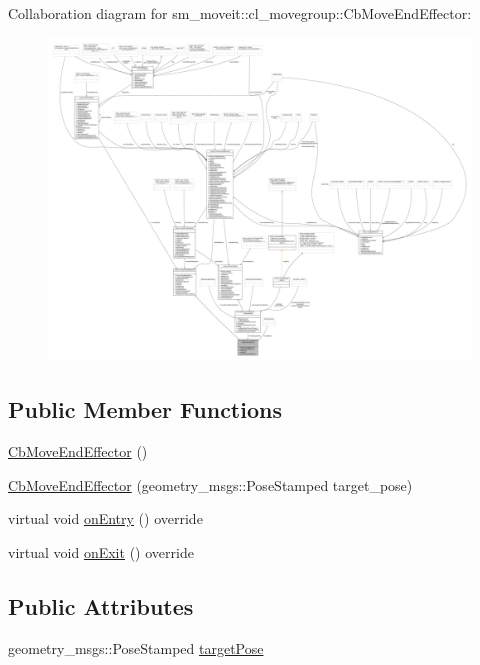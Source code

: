 Collaboration diagram for sm\+\_\+moveit\+:\+:cl\+\_\+movegroup\+:\+:Cb\+Move\+End\+Effector\+:
\nopagebreak
\begin{figure}[H]
\begin{center}
\leavevmode
\includegraphics[width=350pt]{classsm__moveit_1_1cl__movegroup_1_1CbMoveEndEffector__coll__graph}
\end{center}
\end{figure}
\subsection*{Public Member Functions}
\begin{DoxyCompactItemize}
\item 
\hyperlink{classsm__moveit_1_1cl__movegroup_1_1CbMoveEndEffector_a38a92c1ccfbd85eea5de376a50faf414}{Cb\+Move\+End\+Effector} ()
\item 
\hyperlink{classsm__moveit_1_1cl__movegroup_1_1CbMoveEndEffector_a9c41c91e8d1a1ff202e32a68bc8e8f78}{Cb\+Move\+End\+Effector} (geometry\+\_\+msgs\+::\+Pose\+Stamped target\+\_\+pose)
\item 
virtual void \hyperlink{classsm__moveit_1_1cl__movegroup_1_1CbMoveEndEffector_a5283300e460b4a2665537e0c0388e68b}{on\+Entry} () override
\item 
virtual void \hyperlink{classsm__moveit_1_1cl__movegroup_1_1CbMoveEndEffector_a1c7068049141cf465ac22bdd963b97ec}{on\+Exit} () override
\end{DoxyCompactItemize}
\subsection*{Public Attributes}
\begin{DoxyCompactItemize}
\item 
geometry\+\_\+msgs\+::\+Pose\+Stamped \hyperlink{classsm__moveit_1_1cl__movegroup_1_1CbMoveEndEffector_aa0b15a6432dd78c81bb242561a712796}{target\+Pose}
\end{DoxyCompactItemize}

